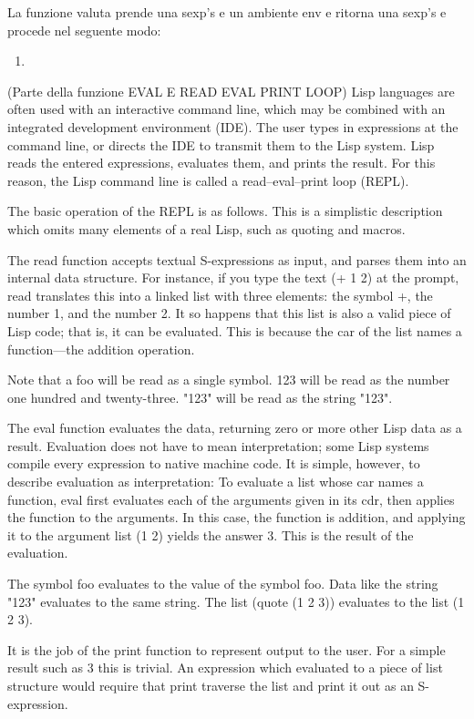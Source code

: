 \documentclass[a4paper]{book}
\begin{document}
La funzione valuta prende una sexp's e un ambiente env e ritorna una sexp's e procede nel seguente modo:
\begin{enumerate}
  \item 
\end{enumerate}



     (Parte della funzione EVAL E READ EVAL PRINT LOOP)
Lisp languages are often used with an interactive command line, which may be combined with an integrated development environment (IDE). The user types in expressions at the command line, or directs the IDE to transmit them to the Lisp system. Lisp reads the entered expressions, evaluates them, and prints the result. For this reason, the Lisp command line is called a read–eval–print loop (REPL).

The basic operation of the REPL is as follows. This is a simplistic description which omits many elements of a real Lisp, such as quoting and macros.

The read function accepts textual S-expressions as input, and parses them into an internal data structure. For instance, if you type the text (+ 1 2) at the prompt, read translates this into a linked list with three elements: the symbol +, the number 1, and the number 2. It so happens that this list is also a valid piece of Lisp code; that is, it can be evaluated. This is because the car of the list names a function—the addition operation.

Note that a foo will be read as a single symbol. 123 will be read as the number one hundred and twenty-three. "123" will be read as the string "123".

The eval function evaluates the data, returning zero or more other Lisp data as a result. Evaluation does not have to mean interpretation; some Lisp systems compile every expression to native machine code. It is simple, however, to describe evaluation as interpretation: To evaluate a list whose car names a function, eval first evaluates each of the arguments given in its cdr, then applies the function to the arguments. In this case, the function is addition, and applying it to the argument list (1 2) yields the answer 3. This is the result of the evaluation.

The symbol foo evaluates to the value of the symbol foo. Data like the string "123" evaluates to the same string. The list (quote (1 2 3)) evaluates to the list (1 2 3).

It is the job of the print function to represent output to the user. For a simple result such as 3 this is trivial. An expression which evaluated to a piece of list structure would require that print traverse the list and print it out as an S-expression.
\end{document}
